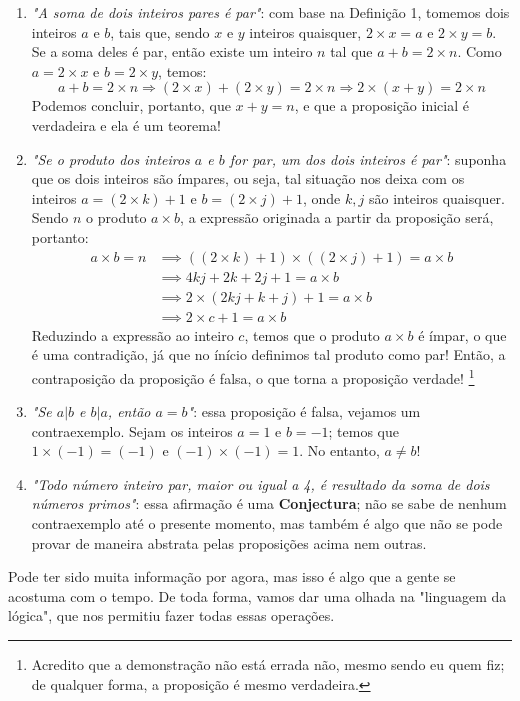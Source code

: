 \documentclass{article}
\begin{document}
\begin{enumerate}
    \item \emph{"A soma de dois inteiros pares é par"}: com base na Definição 1, tomemos dois inteiros $a$ e $b$, tais que, sendo $x$ e $y$ inteiros quaisquer, $2 \times x = a$ e $2 \times y = b$. Se a soma deles é par, então existe um inteiro $n$ tal que $a + b = 2 \times n$. Como $a = 2 \times x$ e $b = 2 \times y$, temos:
    \begin{equation}
        a + b = 2 \times n
        \Longrightarrow (2 \times x) + (2 \times y) = 2 \times n
        \Longrightarrow 2 \times (x + y) = 2 \times n
    \end{equation}
    Podemos concluir, portanto, que $x + y = n$, e que a proposição inicial é verdadeira e ela é um teorema! 
    \item \emph{"Se o produto dos inteiros $a$ e $b$ for par, um dos dois inteiros é par"}: suponha que os dois inteiros são ímpares, ou seja, tal situação nos deixa com os inteiros $a = (2 \times k) + 1$ e $b = (2 \times j) + 1$, onde $k, j$ são inteiros quaisquer.
    Sendo $n$ o produto $a \times b$, a expressão originada a partir da proposição será, portanto:
        \begin{align*}
        a \times b = n &\implies 
        ((2 \times k) + 1) \times ((2 \times j) + 1) = a \times b \\ &\implies 
        4kj + 2k + 2j + 1 = a \times b \\ &\implies
        2 \times (2kj + k + j) + 1 = a \times b \\ &\implies
        2 \times c + 1 = a \times b
        \end{align*}
    Reduzindo a expressão ao inteiro $c$, temos que o produto $a \times b$ é ímpar, o que é uma contradição, já que no ínício definimos tal produto como par! Então, a contraposição da proposição é falsa, o que torna a proposição verdade!
    \footnote{Acredito que a demonstração não está errada não, mesmo sendo eu quem fiz; de qualquer forma, a proposição é mesmo verdadeira.}
    \item \emph{"Se $a|b$ e $b|a$, então $a = b$"}: essa proposição é falsa, vejamos um contraexemplo. Sejam os inteiros $a = 1$ e $b = -1$; temos que $ 1 \times (-1) = (-1)$ e $(-1) \times (-1) = 1$. No entanto, $a \ne b$!
    \item \emph{"Todo número inteiro par, maior ou igual a 4, é resultado da soma de dois números primos"}: essa afirmação é uma \textbf{Conjectura}; não se sabe de nenhum contraexemplo até o presente momento, mas também é algo que não se pode provar de maneira abstrata pelas proposições acima nem outras.
\end{enumerate}
Pode ter sido muita informação por agora, mas isso é algo que a gente se acostuma com o tempo. De toda forma, vamos dar uma olhada na "linguagem da lógica", que nos permitiu fazer todas essas operações.
\end{document}
